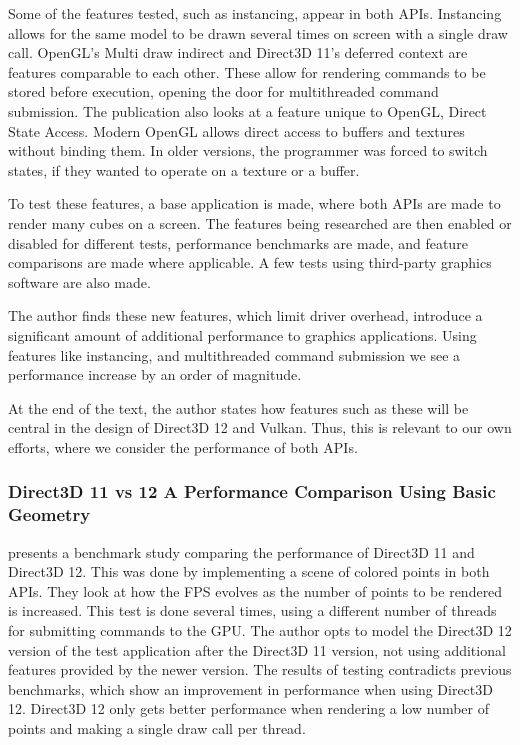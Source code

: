 Some of the features tested, such as instancing, appear in both \glspl{API}.
Instancing allows for the same model to be drawn several times on screen with a single draw call.
OpenGL’s Multi draw indirect and Direct3D 11’s deferred context are features comparable to each other.
These allow for rendering commands to be stored before execution, opening the door for multithreaded command submission.
The publication also looks at a feature unique to OpenGL, Direct State Access.
Modern OpenGL allows direct access to buffers and textures without binding them.
In older versions, the programmer was forced to switch states, if they wanted to operate on a texture or a buffer.


To test these features, a base application is made, where both \glspl{API} are made to render many cubes on a screen.
The features being researched are then enabled or disabled for different tests, performance benchmarks are made, and feature comparisons are made where applicable.
A few tests using third-party graphics software are also made.


The author finds these new features, which limit driver overhead, introduce a significant amount of additional performance to graphics applications.
Using features like instancing, and multithreaded command submission we see a performance increase by an order of magnitude.


At the end of the text, the author states how features such as these will be central in the design of Direct3D 12 and Vulkan.
Thus, this is relevant to our own efforts, where we consider the performance of both \glspl{API}.

\subsubsection{Direct3D 11 vs 12 A Performance Comparison Using Basic Geometry}
\citet{2016_direct3d} presents a benchmark study comparing the performance of Direct3D 11 and Direct3D 12.
This was done by implementing a scene of colored points in both \glspl{API}. 
They look at how the \gls{FPS} evolves as the number of points to be rendered is increased.
This test is done several times, using a different number of threads for submitting commands to the \gls{GPU}. 
The author opts to model the Direct3D 12 version of the test application after the Direct3D 11 version, not using additional features provided by the newer version. 
The results of testing contradicts previous benchmarks, which show an improvement in performance when using Direct3D 12.
Direct3D 12 only gets better performance when rendering a low number of points and making a single draw call per thread.

